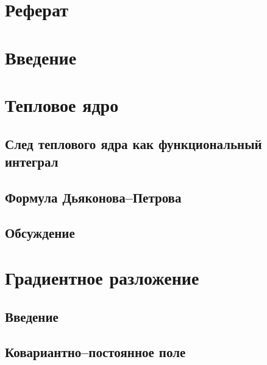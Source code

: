




\setcounter{page}{2}

\chapter*{Реферат}


\tableofcontents

\chapter*{Введение}
{}


\chapter{Тепловое ядро}
\label{ch:HeatKernel}


	\section{След теплового ядра как функциональный интеграл}
	

	\section{Формула Дьяконова--Петрова}
	

	\section{Обсуждение}
	\label{sec:HeatKernelDiscussion}
	

\chapter{Градиентное разложение}
\label{ch:DerivExpan}

	\section{Введение}
	

	\section{Ковариантно--постоянное поле}
	\label{sec:CovarConstField}
	


